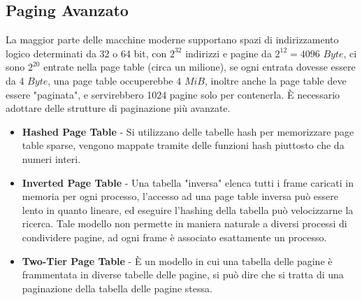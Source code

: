 \documentclass[12pt, letterpaper]{article}
\begin{document}
\subsection{Paging Avanzato}
La maggior parte delle macchine moderne supportano spazi di indirizzamento logico determinati da 32 o 64 bit,
con \(2^{32}\) indirizzi e pagine da \(2^{12}=4096\) \(Byte\), ci sono \(2^{20}\) entrate nella page table (circa un 
milione), se ogni entrata dovesse essere da 4 \(Byte\), una page table occuperebbe \(4\) \(MiB\), inoltre anche la page 
table deve essere "paginata", e servirebbero 1024 pagine solo per contenerla. È necessario adottare delle strutture di 
paginazione più avanzate.
\begin{itemize}
    \item \textbf{Hashed Page Table} - Si utilizzano delle tabelle hash per memorizzare page table sparse, vengono 
    mappate tramite delle funzioni hash piuttosto che da numeri interi.
    \item  \textbf{Inverted Page Table} - Una tabella "inversa" elenca tutti i frame caricati in memoria per ogni 
    processo, l'accesso ad una page table inversa può essere lento in quanto lineare, ed eseguire l'hashing della 
    tabella può velocizzarne la ricerca. Tale modello non permette in maniera naturale a diversi processi di 
    condividere pagine, ad ogni frame è associato esattamente un processo.
    \item \textbf{Two-Tier Page Table} - È un modello in cui una tabella delle pagine è frammentata in diverse tabelle delle pagine,
    si può dire che si tratta di una paginazione della tabella delle pagine stessa.
\end{itemize}
\end{document}
